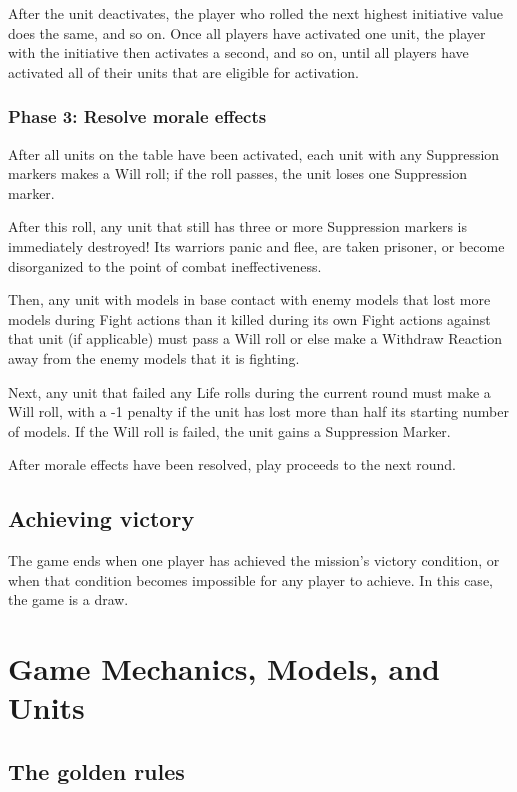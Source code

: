 \begin{multicols}{2}
After the unit deactivates, the player who rolled the next highest initiative value does the same, and so on. Once all players have activated one unit, the player with the initiative then activates a second, and so on, until all players have activated all of their units that are eligible for activation.


\subsection*{Phase 3: Resolve morale effects}

After all units on the table have been activated, each unit with any Suppression markers makes a Will roll; if the roll passes, the unit loses one Suppression marker.

After this roll, any unit that still has three or more Suppression markers is immediately destroyed! Its warriors panic and flee, are taken prisoner, or become disorganized to the point of combat ineffectiveness.

Then, any unit with models in base contact with enemy models that lost more models during Fight actions than it killed during its own Fight actions against that unit (if applicable) must pass a Will roll or else make a Withdraw Reaction away from the enemy models that it is fighting.

Next, any unit that failed any Life rolls during the current round must make a Will roll, with a -1 penalty if the unit has lost more than half its starting number of models. If the Will roll is failed, the unit gains a Suppression Marker.

After morale effects have been resolved, play proceeds to the next round.

\section*{Achieving victory}

The game ends when one player has achieved the mission's victory condition, or when that condition becomes impossible for any player to achieve. In this case, the game is a draw.




\chapter*{Game Mechanics, Models, and Units}

\section*{The golden rules}


\end{multicols}
